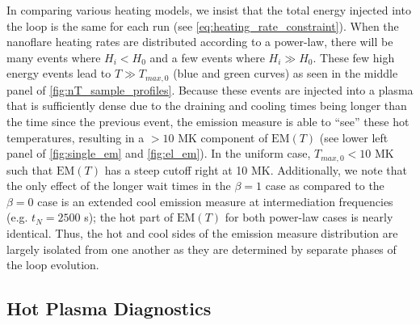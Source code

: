\documentclass[preprint,linenumbers]{aastex}
\begin{document}
	\par In comparing various heating models, we insist that the total energy injected into the loop is the same for each run (see \autoref{eq:heating_rate_constraint}). When the nanoflare heating rates are distributed according to a power-law, there will be many events where $H_i<H_0$ and a few events where $H_i\gg H_0$. These few high energy events lead to $T\gg T_{max,0}$ (blue and green curves) as seen in the middle panel of \autoref{fig:nT_sample_profiles}. Because these events are injected into a plasma that is sufficiently dense due to the draining and cooling times being longer than the time since the previous event, the emission measure is able to ``see'' these hot temperatures, resulting in a $>10$ MK component of $\mathrm{EM}(T)$ (see lower left panel of \autoref{fig:single_em} and \autoref{fig:el_em}). In the uniform case, $T_{max,0}<10$ MK such that $\mathrm{EM}(T)$ has a steep cutoff right at 10 MK. Additionally, we note that the only effect of the longer wait times in the $\beta=1$ case as compared to the $\beta=0$ case is an extended cool emission measure at intermediation frequencies (e.g. $t_N=2500$ s); the hot part of $\mathrm{EM}(T)$ for both power-law cases is nearly identical. Thus, the hot and cool sides of the emission measure distribution are largely isolated from one another as they are determined by separate phases of the loop evolution.
	\subsection{Hot Plasma Diagnostics}
	\label{subsec:diagnostics}
\end{document}
